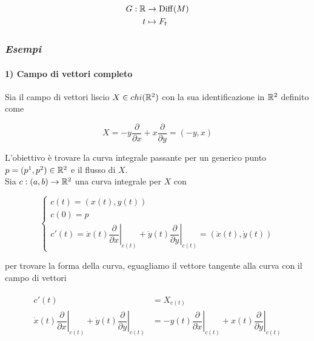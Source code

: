 \begin{align}
	\begin{split}
		G : \mathbb{R} &\to \operatorname{Diff}(M)\\
		t &\mapsto F_{t}
	\end{split}
\end{align}

\subsubsection{\textit{Esempi}}

\paragraph{1) Campo di vettori completo}

Sia il campo di vettori liscio $ X \in chi(\mathbb{R}^{2}) $ con la sua identificazione in $ \mathbb{R}^{2} $ definito come

\begin{equation}
	X = - y \dfrac{\partial}{\partial x} + x \dfrac{\partial}{\partial y} = (-y, x)
\end{equation}

L'obiettivo è trovare la curva integrale passante per un generico punto $ p = (p^{1},p^{2}) \in \mathbb{R}^{2} $ e il flusso di $ X $.\\
Sia $ c : (a,b) \to \mathbb{R}^{2} $ una curva integrale per $ X $ con

\begin{equation}
	\begin{cases}
		c(t) = (x(t),y(t))\\
		c(0) = p\\
		c'(t) = \dot{x}(t) \left. \dfrac{\partial}{\partial x} \right|_{c(t)} + \dot{y}(t) \left. \dfrac{\partial}{\partial y} \right|_{c(t)} = (\dot{x}(t),\dot{y}(t))		
	\end{cases}
\end{equation}

per trovare la forma della curva, eguagliamo il vettore tangente alla curva con il campo di vettori

\begin{align}
	\begin{split}
		c'(t) &= X_{c(t)}\\
		\dot{x}(t) \left. \dfrac{\partial}{\partial x} \right|_{c(t)} + \dot{y}(t) \left. \dfrac{\partial}{\partial y} \right|_{c(t)} &= - y(t) \left. \dfrac{\partial}{\partial x} \right|_{c(t)} + x(t) \left. \dfrac{\partial}{\partial y} \right|_{c(t)}
	\end{split}
\end{align}

